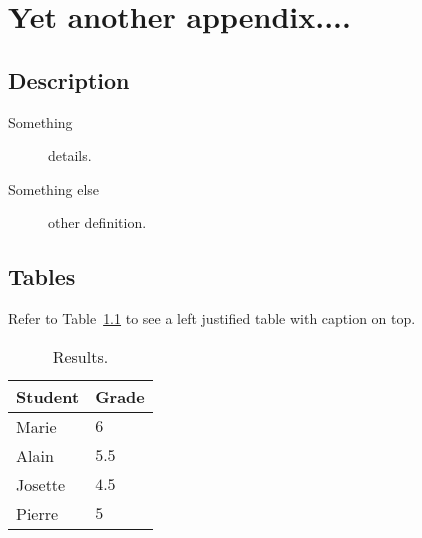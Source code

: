 \chapter{Yet another appendix....}

\section{Description}
\begin{description}
\item[Something] details.
\item[Something else] other definition.
\end{description}

\section{Tables}
Refer to Table~\ref{tab:example} to see a left justified table with caption
on top.

\begin{table}[ht]
\centering
\caption[Test results]{\label{tab:example}Results.}
\begin{tabular}{ll}
\hline
\textbf{Student} & \textbf{Grade}\\
\hline
Marie  & $6$\\
Alain  & $5.5$\\
Josette  & $4.5$\\
Pierre  & $5$\\
\hline
\end{tabular}
\end{table}

